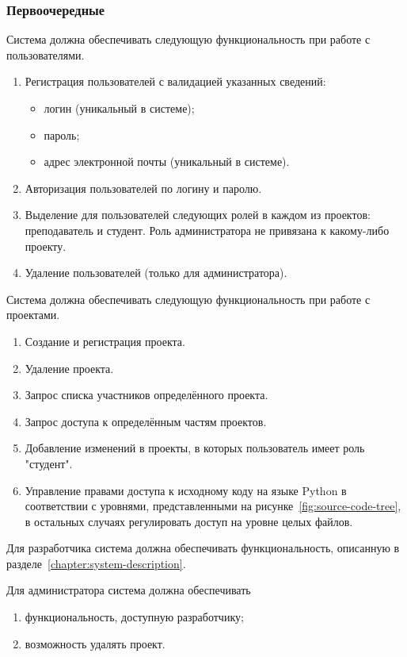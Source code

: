 \documentclass{bmstu}
\begin{document}
  \subsubsection{Первоочередные}

  Система должна обеспечивать следующую функциональность при работе с пользователями.
  \begin{enumerate}[label*=\arabic*.]
    \item Регистрация пользователей с валидацией указанных
      сведений:
      \begin{itemize}[label=---]
        \item логин (уникальный в системе);
        \item пароль;
        \item адрес электронной почты (уникальный в системе).
      \end{itemize}
    \item Авторизация пользователей по логину и паролю.
    \item Выделение для пользователей следующих ролей в каждом из проектов: преподаватель и студент. Роль администратора не привязана к какому-либо проекту.
    \item Удаление пользователей (только для администратора).
  \end{enumerate}

  Система должна обеспечивать следующую функциональность при работе с проектами.
  \begin{enumerate}[label*=\arabic*.]
    \item Создание и регистрация проекта.
    \item Удаление проекта.
    \item Запрос списка участников определённого проекта.
    \item Запрос доступа к определённым частям проектов.
    \item Добавление изменений в проекты, в которых пользователь имеет роль "студент".
    \item Управление правами доступа к исходному коду на языке Python в соответствии с уровнями, представленными на рисунке~\ref{fig:source-code-tree}, в остальных случаях регулировать доступ на уровне целых файлов.
  \end{enumerate}

  Для разработчика система должна обеспечивать функциональность,
  описанную в разделе~\ref{chapter:system-description}.

  Для администратора система должна обеспечивать
  \begin{enumerate}[label*=\arabic*)]
    \item функциональность, доступную разработчику;
    \item возможность удалять проект.
  \end{enumerate}
\end{document}
